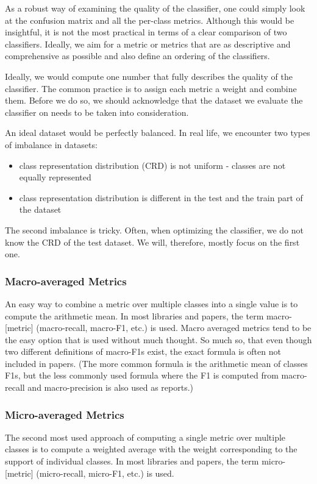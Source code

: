 As a robust way of examining the quality of the classifier, one could simply look at the confusion matrix and all the per-class metrics. Although this would be insightful, it is not the most practical in terms of a clear comparison of two classifiers. Ideally, we aim for a metric or metrics that are as descriptive and comprehensive as possible and also define an ordering of the classifiers.

Ideally, we would compute one number that fully describes the quality of the classifier. The common practice is to assign each metric a weight and combine them. Before we do so, we should acknowledge that the dataset we evaluate the classifier on needs to be taken into consideration.

An ideal dataset would be perfectly balanced. In real life, we encounter two types of imbalance in datasets:

\begin{itemize}
\item class representation distribution (CRD) is not uniform - classes are not equally represented 

\item class representation distribution is different in the test and the train part of the dataset
\end{itemize}
The second imbalance is tricky. Often, when optimizing the classifier, we do not know the CRD of the test dataset. We will, therefore, mostly focus on the first one. 


\subsubsection{Macro-averaged Metrics}

An easy way to combine a metric over multiple classes into a single value is to compute the arithmetic mean. In most libraries and papers, the term macro-[metric] (macro-recall, macro-F1, etc.) is used.  Macro averaged metrics tend to be the easy option that is used without much thought. So much so, that even though two different definitions of macro-F1s exist, the exact formula is often not included in papers. (The more common formula is the arithmetic mean of classes F1s, but the less commonly used formula where the F1 is computed from macro-recall and macro-precision is also used as  \cite{Opitz2019MacroFA} reports.)

\subsubsection{Micro-averaged Metrics}
The second most used approach of computing a single metric over multiple classes is to compute a weighted average with the weight corresponding to the support of individual classes. In most libraries and papers, the term micro-[metric] (micro-recall, micro-F1, etc.) is used. 

